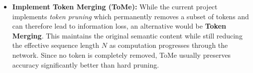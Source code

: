\begin{itemize}
 \item \textbf{Implement Token Merging (ToMe):} While the current project implements \textit{token pruning} which permanently removes a subset of tokens and can therefore lead to information loss, an alternative would be \textbf{Token Merging}. This maintains the original semantic content while still reducing the effective sequence length $N$ as computation progresses through the network. Since no token is completely removed, ToMe usually preserves accuracy significantly better than hard pruning.

\end{itemize}